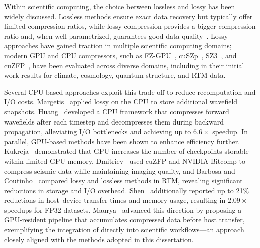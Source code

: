 \documentclass[Ingles,Final]{ic-tese-v3}
\begin{document}
Within scientific computing, the choice between lossless and lossy \compression has been widely discussed. Lossless methods ensure exact data recovery but typically offer limited compression ratios, while lossy compression provides a bigger compression ratio and, when well parametrized, guarantees good data quality~\cite{cappello2025,fz,liu2022,di2025}. Lossy approaches have gained traction in multiple scientific computing domains; modern GPU and CPU compressors, such as FZ-GPU~\cite{fz}, cuSZp~\cite{cuszp}, SZ3~\cite{sz3}, and cuZFP~\cite{zfp}, have been evaluated across diverse domains, including in their initial work results for climate, cosmology, quantum structure, and RTM data.

Several CPU-based approaches exploit this trade-off to reduce recomputation and I/O costs. Margetis~\etal\cite{margetis2021,margetis2023} applied lossy \compression on the CPU to store additional wavefield snapshots. Huang~\etal\cite{huang2023} developed a CPU framework that compresses forward wavefields after each timestep and decompresses them during backward propagation, alleviating I/O bottlenecks and achieving up to $6.6\times$ speedup. In parallel, GPU-based methods have been shown to enhance efficiency further. Kukreja~\etal\cite{kukreja2020} demonstrated that GPU \compression increases the number of checkpoints storable within limited GPU memory. Dmitriev~\etal\cite{dmitriev2022} used cuZFP and NVIDIA Bitcomp to compress seismic data while maintaining imaging quality, and Barbosa and Coutinho~\cite{barbosa2023} compared lossy and lossless methods in RTM, revealing significant reductions in storage and I/O overhead. Shen~\etal\cite{shen2022,shen2023} additionally reported up to 21\% reductions in host–device transfer times and memory usage, resulting in $2.09\times$ speedups for FP32 datasets. Maurya~\etal\cite{maurya2023compress} advanced this direction by proposing a GPU-resident pipeline that accumulates compressed data before host transfer, exemplifying the integration of \compression directly into scientific workflows—an approach closely aligned with the methods adopted in this dissertation.
\end{document}
